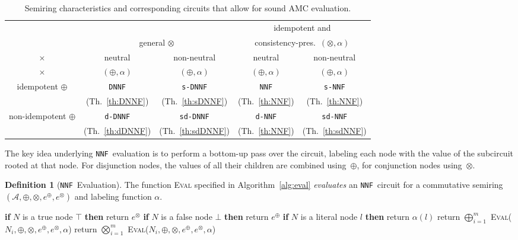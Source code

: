 \documentclass{article}
\theoremstyle{plain}
\theoremstyle{definition}
\newtheorem{definition}{Definition}
\newcommand{\NNF}{{\tt NNF}}
\newcommand{\dNNF}{{\tt d-NNF}}
\newcommand{\sNNF}{{\tt s-NNF}}
\newcommand{\DNNF}{{\tt DNNF}}
\newcommand{\dDNNF}{{\tt d-DNNF}}
\newcommand{\sDNNF}{{\tt s-DNNF}}
\newcommand{\sdDNNF}{{\tt sd-DNNF}}
\newcommand{\sdNNF}{{\tt sd-NNF}}
\begin{document}
\begin{table}
\center
\begin{tabular}{c||c|c||c|c}
& \multicolumn{2}{c||}{} & \multicolumn{2}{c}{idempotent and}\\ 
& \multicolumn{2}{c||}{general $\otimes$} & \multicolumn{2}{c}{consistency-pres.~$(\otimes,\alpha)$}\\ 
× & neutral & non-neutral & neutral & non-neutral \\ 
× & $(\oplus,\alpha)$ &$(\oplus,\alpha)$ & $(\oplus,\alpha)$ & $(\oplus,\alpha)$ \\ \hline \hline
idempotent $\oplus$ & \DNNF & \sDNNF & \NNF & \sNNF\\ 
& (Th.~\ref{th:DNNF}) & (Th.~\ref{th:sDNNF}) & (Th.~\ref{th:NNF}) & (Th.~\ref{th:NNF})  \\ \hline
non-idempotent $\oplus$ & \dDNNF & \sdDNNF & \dNNF & \sdNNF \\
 & (Th.~\ref{th:dDNNF}) & (Th.~\ref{th:sdDNNF}) & (Th.~\ref{th:NNF}) & (Th.~\ref{th:sdNNF})
\end{tabular}
\caption{Semiring characteristics and corresponding circuits that
  allow for sound AMC evaluation.}\label{tab:eval}
\end{table}

The key idea underlying \NNF\ evaluation is to perform a bottom-up
pass over the circuit, labeling each node with the value of the
subcircuit rooted at that node. For disjunction nodes, the values of
all their 
children are combined using~$\oplus$, for conjunction nodes using~$\otimes$.
\begin{definition}[\NNF\ Evaluation]
The function \textsc{Eval} specified in Algorithm~\ref{alg:eval} \emph{evaluates} an \NNF\ circuit for a commutative semiring $(\mathcal{A},\oplus,\otimes, e^{\oplus},e^{\otimes})$ and labeling function $\alpha$.
\end{definition}

\begin{algorithm}[t]
  \caption[\textsc{Label}]{Evaluating an \NNF\ circuit $N$ for a
    commutative semiring $(\mathcal{A},\oplus,\otimes,
    e^{\oplus},e^{\otimes})$ and labeling function $\alpha$.}
\label{alg:eval}
\begin{algorithmic}[1]
\STATE \textbf{if} $N$ is a true node $\top$ \textbf{then} return $e^{\otimes}$
\STATE \textbf{if} $N$ is a false node $\bot$ \textbf{then} return $e^{\oplus}$
\STATE \textbf{if} $N$ is a literal node $l$ \textbf{then} return $\alpha(l)$
 \STATE return $\bigoplus_{i=1}^m$ \textsc{Eval}($N_i,\oplus,\otimes,e^{\oplus},e^{\otimes},\alpha$) \ENDIF
{} \STATE return $\bigotimes_{i=1}^m$ \textsc{Eval}($N_i,\oplus,\otimes,e^{\oplus},e^{\otimes},\alpha$) \ENDIF
\ENDFUNCTION
\end{algorithmic}
\end{algorithm}
\end{document}
